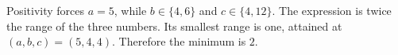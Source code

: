 Positivity forces $a=5$, while $b\in\{4,6\}$ and $c\in\{4,12\}$. The expression is twice the range of the three numbers. Its smallest range is one, attained at $(a,b,c)=(5,4,4)$. Therefore the minimum is $\boxed2$.
